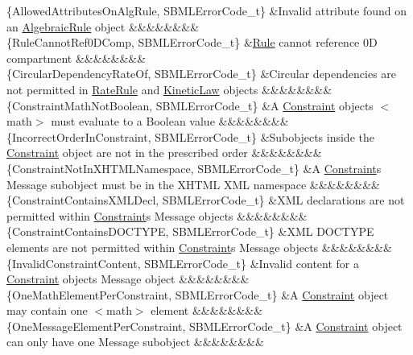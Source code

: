 \begin{DoxyParagraph}{}
\begin{longtabu}
\{Allowed\+Attributes\+On\+Alg\+Rule, S\+B\+M\+L\+Error\+Code\+\_\+t\} &Invalid attribute found on an \hyperlink{class_algebraic_rule}{Algebraic\+Rule} object &&&&&&&&\\
\{Rule\+Cannot\+Ref0\+D\+Comp, S\+B\+M\+L\+Error\+Code\+\_\+t\} &\hyperlink{class_rule}{Rule} cannot reference 0D compartment &&&&&&&&\\
\{Circular\+Dependency\+Rate\+Of, S\+B\+M\+L\+Error\+Code\+\_\+t\} &Circular dependencies are not permitted in \hyperlink{class_rate_rule}{Rate\+Rule} and \hyperlink{class_kinetic_law}{Kinetic\+Law} objects &&&&&&&&\\
\{Constraint\+Math\+Not\+Boolean, S\+B\+M\+L\+Error\+Code\+\_\+t\} &A \hyperlink{class_constraint}{Constraint} object\textquotesingle{}s {\ttfamily $<$math$>$} must evaluate to a Boolean value &&&&&&&&\\
\{Incorrect\+Order\+In\+Constraint, S\+B\+M\+L\+Error\+Code\+\_\+t\} &Subobjects inside the \hyperlink{class_constraint}{Constraint} object are not in the prescribed order &&&&&&&&\\
\{Constraint\+Not\+In\+X\+H\+T\+M\+L\+Namespace, S\+B\+M\+L\+Error\+Code\+\_\+t\} &A \hyperlink{class_constraint}{Constraint}\textquotesingle{}s Message subobject must be in the X\+H\+T\+ML X\+ML namespace &&&&&&&&\\
\{Constraint\+Contains\+X\+M\+L\+Decl, S\+B\+M\+L\+Error\+Code\+\_\+t\} &X\+ML declarations are not permitted within \hyperlink{class_constraint}{Constraint}\textquotesingle{}s Message objects &&&&&&&&\\
\{Constraint\+Contains\+D\+O\+C\+T\+Y\+PE, S\+B\+M\+L\+Error\+Code\+\_\+t\} &X\+ML D\+O\+C\+T\+Y\+PE elements are not permitted within \hyperlink{class_constraint}{Constraint}\textquotesingle{}s Message objects &&&&&&&&\\
\{Invalid\+Constraint\+Content, S\+B\+M\+L\+Error\+Code\+\_\+t\} &Invalid content for a \hyperlink{class_constraint}{Constraint} object\textquotesingle{}s Message object &&&&&&&&\\
\{One\+Math\+Element\+Per\+Constraint, S\+B\+M\+L\+Error\+Code\+\_\+t\} &A \hyperlink{class_constraint}{Constraint} object may contain one {\ttfamily $<$math$>$} element &&&&&&&&\\
\{One\+Message\+Element\+Per\+Constraint, S\+B\+M\+L\+Error\+Code\+\_\+t\} &A \hyperlink{class_constraint}{Constraint} object can only have one Message subobject &&&&&&&&\\

\end{longtabu}
\end{DoxyParagraph}

